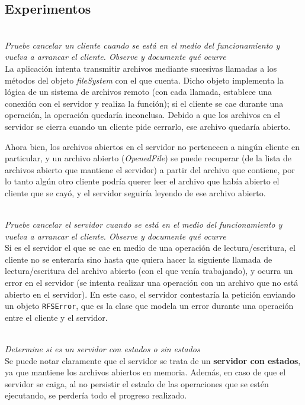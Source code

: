 \subsection{Experimentos}

~\\
\emph{Pruebe cancelar un cliente cuando se está en el medio del funcionamiento y vuelva a arrancar el cliente. Observe y documente qué ocurre} 
~\\

La aplicación intenta transmitir archivos mediante sucesivas llamadas a los métodos del objeto \emph{fileSystem} con el que cuenta. Dicho objeto implementa la lógica de un sistema de archivos remoto (con cada llamada, establece una conexión con el servidor y realiza la función); si el cliente se cae durante una operación, la operación quedaría inconclusa. Debido a que los archivos en el servidor se cierra cuando un cliente pide cerrarlo, ese archivo quedaría abierto. 

Ahora bien, los archivos abiertos en el servidor no pertenecen a ningún cliente en particular, y un archivo abierto (\emph{OpenedFile}) se puede recuperar (de la lista de archivos abierto que mantiene el servidor) a partir del archivo que contiene, por lo tanto algún otro cliente podría querer leer el archivo que había abierto el cliente que se cayó, y el servidor seguiría leyendo de ese archivo abierto.

~\\
\emph{Pruebe cancelar el servidor cuando se está en el medio del funcionamiento y vuelva a arrancar el cliente.  Observe y documente qué ocurre} 
~\\

Si es el servidor el que se cae en medio de una operación de lectura/escritura, el cliente no se enteraría sino hasta que quiera hacer la siguiente llamada de lectura/escritura del archivo abierto (con el que venía trabajando), y ocurra un error en el servidor (se intenta realizar una operación con un archivo que no está abierto en el servidor). En este caso, el servidor contestaría la petición enviando un objeto \texttt{RFSError}, que es la clase que modela un error durante una operación entre el cliente y el servidor. 

~\\
\emph{Determine si es un servidor con estados o sin estados} 
~\\

Se puede notar claramente que el servidor se trata de un \textbf{servidor con estados}, ya que mantiene los archivos abiertos en memoria. Además, en caso de que el servidor se caiga, al no persistir el estado de las operaciones que se estén ejecutando, se perdería todo el progreso realizado. 

